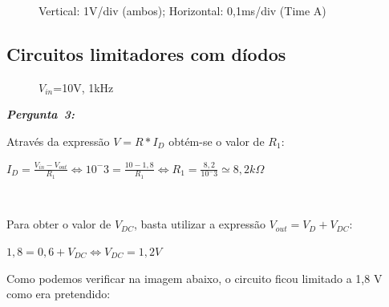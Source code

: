 \documentclass[pdftex,12pt,a4paper]{report}
\begin{document}
\begin{figure}[h]
\centerline{}
\caption{Vertical: 1V/div (ambos); Horizontal: 0,1ms/div (Time A)}\label{grafico_12_02_osciloscopio}
\end{figure}

\newpage
\subsection{Circuitos limitadores com díodos}
\begin{figure}[h]
\centerline{}
\caption{$V_{in}$=10V, 1kHz}\label{circuito13}
\end{figure}

\hbox{\emph{\textbf{Pergunta 3:}\newline}}


Através da expressão $V = R*I_D$ obtém-se o valor de $R_1$:\newline
\centerline{$I_D = \frac{V_{in} - V_{out}}{R_1} \Leftrightarrow 10^-3 = \frac{10-1,8}{R_1} \Leftrightarrow R_1 = \frac{8,2}{10^-3} \simeq 8,2k\Omega$}\\
\vspace{0.1cm}

Para obter o valor de $V_{DC}$, basta utilizar a expressão $V_{out} = V_D + V_{DC}$:
\centerline{$ 1,8 = 0,6 + V_{DC} \Leftrightarrow V_{DC} = 1,2V$}
\vspace{0.2cm}

Como podemos verificar na imagem abaixo, o circuito ficou limitado a 1,8 V como era pretendido:
\end{document}
